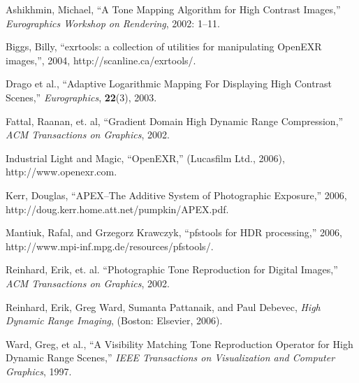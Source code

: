 \begin{verbatim}
\end{verbatim}

\begin{thebibliography}{1}

 Ashikhmin, Michael, ``A Tone Mapping Algorithm for High Contrast Images,''
{\em Eurographics Workshop on Rendering}, 2002: 1--11.

 Biggs, Billy, ``exrtools: a collection of utilities for manipulating
OpenEXR images,'', 2004, http://scanline.ca/exrtools/.

 Drago et al., ``Adaptive Logarithmic Mapping For Displaying High Contrast Scenes,''
{\em Eurographics}, {\bf 22}(3), 2003.

 Fattal, Raanan, et. al, ``Gradient Domain High Dynamic Range Compression,''
{\em ACM Transactions on Graphics}, 2002.

 Industrial Light and Magic, ``OpenEXR,'' (Lucasfilm Ltd., 2006),
http://www.openexr.com.

 Kerr, Douglas, ``APEX--The Additive System of Photographic Exposure,'' 2006,
http://doug.kerr.home.att.net/pumpkin/APEX.pdf.

 Mantiuk, Rafal, and Grzegorz Krawczyk, ``pfstools for HDR processing,'' 2006,
http://www.mpi-inf.mpg.de/resources/pfstools/.

 Reinhard, Erik, et. al. ``Photographic Tone Reproduction for Digital Images,''
{\em ACM Transactions on Graphics}, 2002.

 Reinhard, Erik, Greg Ward, Sumanta Pattanaik, and Paul Debevec,
{\em High Dynamic Range Imaging}, (Boston: Elsevier, 2006).

 Ward, Greg, et al., ``A Visibility Matching Tone Reproduction Operator for High Dynamic Range Scenes,''
{\em IEEE Transactions on Visualization and Computer Graphics}, 1997.

\end{thebibliography}
